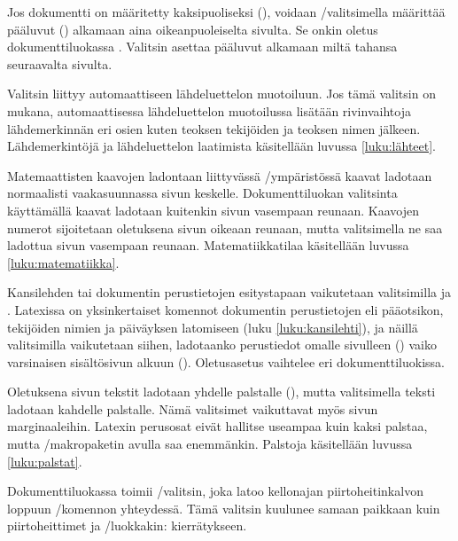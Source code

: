 Jos%
 dokumentti on määritetty
kaksipuoliseksi (), voidaan
\-/valitsimella määrittää pääluvut () alkamaan aina oikeanpuoleiselta sivulta. Se onkin oletus
dokumenttiluokassa . Valitsin  asettaa
pääluvut alkamaan miltä tahansa seuraavalta sivulta.

Valitsin%
  liittyy automaattiseen
lähdeluettelon muotoiluun. Jos tämä valitsin on mukana, automaattisessa
lähdeluettelon muotoilussa lisätään rivinvaihtoja lähdemerkinnän eri
osien kuten teoksen tekijöiden ja teoksen nimen jälkeen. Lähdemerkintöjä
ja lähdeluettelon laatimista käsitellään luvussa \ref{luku:lähteet}.

Matemaattisten%
 kaavojen ladontaan liittyvässä
\-/ympäristössä kaavat ladotaan normaalisti
vaakasuunnassa sivun keskelle. Dokumenttiluokan valitsinta 
käyttämällä kaavat ladotaan kuitenkin sivun vasempaan reunaan. Kaavojen
numerot sijoitetaan oletuksena sivun oikeaan reunaan, mutta valitsimella
 ne saa ladottua sivun vasempaan reunaan. Matematiikkatilaa
käsitellään luvussa \ref{luku:matematiikka}.

Kansilehden%
 tai dokumentin perustietojen
esitystapaan vaikutetaan valitsimilla  ja
. Latexissa on yksinkertaiset komennot dokumentin
perustietojen eli pääotsikon, tekijöiden nimien ja päiväyksen latomiseen
(luku \ref{luku:kansilehti}), ja näillä valitsimilla vaikutetaan siihen,
ladotaanko perustiedot omalle sivulleen () vaiko
varsinaisen sisältösivun alkuun ().
Oletus\-asetus vaihtelee eri dokumenttiluokissa.

Oletuksena%
 sivun tekstit ladotaan yhdelle
palstalle (), mutta valitsimella 
teksti ladotaan kahdelle palstalle. Nämä valitsimet vaikuttavat myös
sivun marginaaleihin. Latexin perusosat eivät hallitse useampaa kuin
kaksi palstaa, mutta \-/makropaketin avulla saa
enemmänkin. Palstoja käsitellään luvussa \ref{luku:palstat}.

Dokumenttiluokassa%
  toimii \-/valitsin, joka
latoo kellon\-ajan piirtoheitinkalvon loppuun \-/komennon yhteydessä. Tämä valitsin kuulunee samaan paikkaan
kuin piirtoheittimet ja \-/luokkakin: kierrätykseen.

